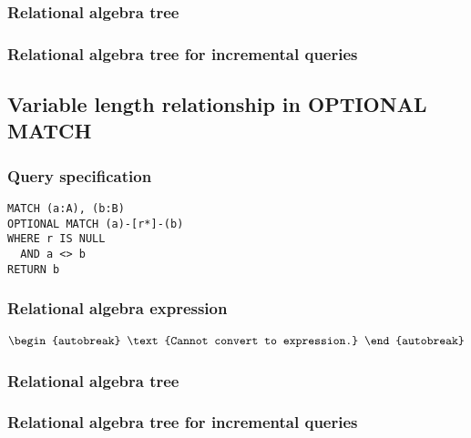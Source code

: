 \subsubsection*{Relational algebra tree}


\subsubsection*{Relational algebra tree for incremental queries}


\subsection{Variable length relationship in OPTIONAL MATCH}

\subsubsection*{Query specification}

\begin{lstlisting}
MATCH (a:A), (b:B)
OPTIONAL MATCH (a)-[r*]-(b)
WHERE r IS NULL
  AND a <> b
RETURN b
\end{lstlisting}

\subsubsection*{Relational algebra expression}

\begin{align*}
\begin{autobreak}
\text{Cannot convert to expression.}
\end{autobreak}
\end{align*}

\subsubsection*{Relational algebra tree}


\subsubsection*{Relational algebra tree for incremental queries}


